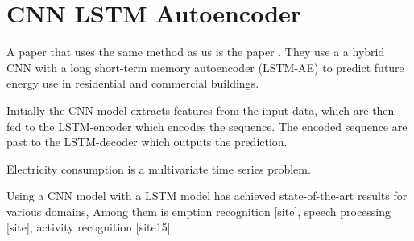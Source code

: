 \section{CNN LSTM Autoencoder }
A paper that uses the same method as us is the paper \cite{Khan2020}.
They use a a hybrid CNN with a long short-term memory autoencoder (LSTM-AE) to predict future energy
use in residential and commercial buildings.

Initially the CNN model extracts features from the input data, which are then fed to the LSTM-encoder
which encodes the sequence. The encoded sequence are past to the LSTM-decoder which outputs the prediction.

Electricity consumption is a multivariate time series problem.

Using a CNN model with a LSTM model has achieved state-of-the-art results for various domains,
Among them is emption recognition 
[site],
speech processing [site],
activity recognition [site15].

